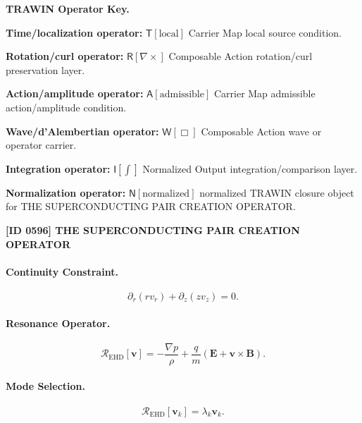 \par\vspace{0.45\baselineskip}
\noindent\begin{minipage}[t]{\linewidth}
\begingroup
\small
\raggedright
\textbf{TRAWIN Operator Key.}\par
\noindent\textbf{Time/localization operator:} $\mathsf{T}\!\left[\mathrm{local}\right]$ Carrier Map local source condition.\par
\noindent\textbf{Rotation/curl operator:} $\mathsf{R}\!\left[\nabla\times\right]$ Composable Action rotation/curl preservation layer.\par
\noindent\textbf{Action/amplitude operator:} $\mathsf{A}\!\left[\mathrm{admissible}\right]$ Carrier Map admissible action/amplitude condition.\par
\noindent\textbf{Wave/d'Alembertian operator:} $\mathsf{W}\!\left[\Box\right]$ Composable Action wave or operator carrier.\par
\noindent\textbf{Integration operator:} $\mathsf{I}\!\left[\int\right]$ Normalized Output integration/comparison layer.\par
\noindent\textbf{Normalization operator:} $\mathsf{N}\!\left[\mathrm{normalized}\right]$ normalized TRAWIN closure object for THE SUPERCONDUCTING PAIR CREATION OPERATOR.\par
\endgroup
\end{minipage}

\clearpage
\noindent\textbf{[ID 0596] THE SUPERCONDUCTING PAIR CREATION OPERATOR}\par
\vspace{0.35em}
\paragraph{Continuity Constraint.}
\begin{equation}
\partial_r(rv_r)+\partial_z(zv_z)=0.
\end{equation}

\paragraph{Resonance Operator.}
\begin{equation}
\mathcal{R}_{\mathrm{EHD}}[\mathbf{v}]
=
-\frac{\nabla p}{\rho}
+
\frac{q}{m}
(\mathbf{E}+\mathbf{v}\times\mathbf{B}).
\end{equation}

\paragraph{Mode Selection.}
\begin{equation}
\mathcal{R}_{\mathrm{EHD}}[\mathbf{v}_k]
=
\lambda_k\mathbf{v}_k.
\end{equation}

